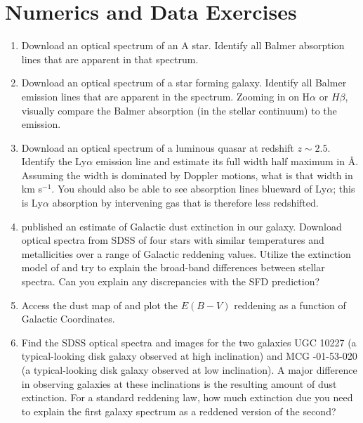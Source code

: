 \section{Numerics and Data Exercises}

\begin{enumerate}
\item Download an optical spectrum of an A star. Identify 
  all Balmer absorption lines that are apparent in that spectrum.
\item Download an optical spectrum of a star forming galaxy. Identify
all Balmer emission lines that are apparent in the spectrum. Zooming
in on H$\alpha$ or $H\beta$, visually compare the Balmer absorption
(in the stellar continuum) to the emission.
\item Download an optical spectrum of a luminous quasar at redshift $z\sim
2.5$. Identify the Ly$\alpha$ emission line and estimate its full
width half maximum in \AA. Assuming the width is dominated by Doppler
motions, what is that width in km s$^{-1}$. You should also be able to
see absorption lines blueward of Ly$\alpha$; this is Ly$\alpha$
absorption by intervening gas that is therefore less redshifted.
\item \citet{schlegel98a} published an estimate of Galactic dust
extinction in our galaxy. Download optical spectra from SDSS
of four stars with similar
temperatures and metallicities over a range of Galactic reddening
values. Utilize the extinction model of \citet{cardelli89a} and try to
explain the broad-band differences between stellar spectra. Can you
explain any discrepancies with the SFD prediction?
\item Access the dust map of \citet{schlegel98a} and plot the $E(B-V)$
    reddening as a function of Galactic Coordinates. 
\item Find the SDSS optical spectra and images for the two galaxies
UGC 10227 (a typical-looking disk galaxy observed at high inclination)
and MCG -01-53-020 (a typical-looking disk galaxy observed at low
inclination). A major difference in observing galaxies at these
inclinations is the resulting amount of dust extinction. For a
standard reddening law, how much extinction due you need to explain
the first galaxy spectrum as a reddened version of the second?
\end{enumerate}


  
